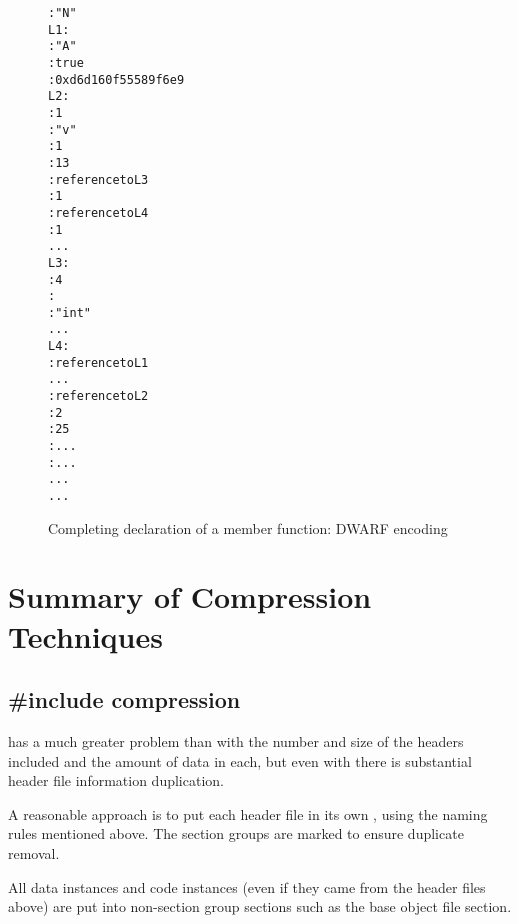 \begin{figure}[ht]
\begin{dwflisting}
\begin{alltt}
  \DWTAGnamespace
      \DWATname{} : "N"
L1:
    \DWTAGclasstype
        \DWATname{} : "A"
        \DWATdeclaration{} : true
        \DWATsignature{} : 0xd6d160f5 5589f6e9
L2:
      \DWTAGsubprogram
          \DWATexternal{} : 1
          \DWATname{} : "v"
          \DWATdeclfile{} : 1
          \DWATdeclline{} : 13
          \DWATtype{} : reference to L3
          \DWATdeclaration{} : 1
        \DWTAGformalparameter
            \DWATtype{} : reference to L4
            \DWATartificial{} : 1
...
L3:
  \DWTAGbasetype
      \DWATbytesize{} : 4
      \DWATencoding{} : \DWATEsigned
      \DWATname{} : "int"
...
L4:
  \DWTAGpointertype
      \DWATtype{} : reference to L1
...
  \DWTAGsubprogram
      \DWATspecification{} : reference to L2
      \DWATdeclfile{} : 2
      \DWATdeclline{} : 25
      \DWATlowpc{} : ...
      \DWAThighpc{} : ...
    \DWTAGlexicalblock
    ...
...
\end{alltt}
\end{dwflisting}
\caption{Completing declaration of a member function: DWARF \mbox{encoding}}
\label{fig:completingedeclarationofamemberfunctiondwarf}
\end{figure}


\clearpage
\section{Summary of Compression Techniques}
\label{app:summaryofcompressiontechniques}
\subsection{\#include compression}
\label{app:includecompression}

 has a much greater 
problem than 
 with the number and
size of the headers included and the amount of data in each,
but even with  
there is substantial header file information
duplication.

A reasonable approach is to put each header file in its own
, using the naming rules mentioned above. The
section groups are marked to ensure duplicate removal.

All data instances and code instances (even if they came
from the header files above) are put 
into non-section group
sections such as the base object file 
\dotdebuginfo{} section.

